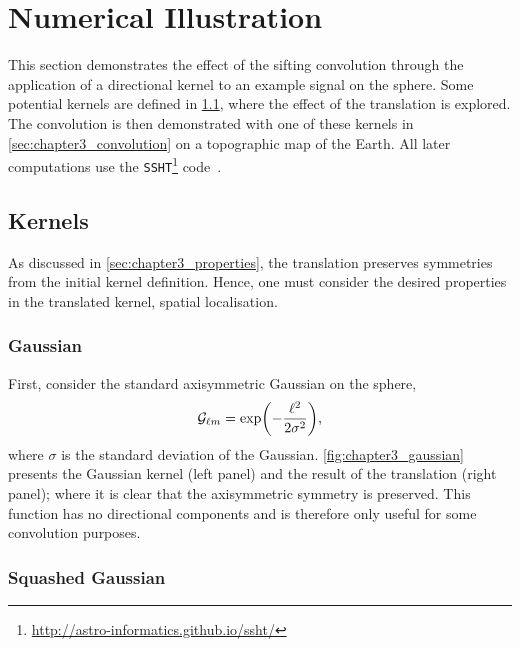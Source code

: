 \section{Numerical Illustration}\label{sec:chapter3_numerical_illustration}

This section demonstrates the effect of the sifting convolution through the application of a directional kernel to an example signal on the sphere.
Some potential kernels are defined in \cref{sec:chapter3_kernels}, where the effect of the translation is explored.
The convolution is then demonstrated with one of these kernels in \cref{sec:chapter3_convolution} on a topographic map of the Earth.
All later computations use the \texttt{SSHT}\footnote{\label{fn:ssht}\url{http://astro-informatics.github.io/ssht/}} code~\cite{McEwen2011}.

\subsection{Kernels}\label{sec:chapter3_kernels}

As discussed in \cref{sec:chapter3_properties}, the translation preserves symmetries from the initial kernel definition.
Hence, one must consider the desired properties in the translated kernel, \eg{} spatial localisation.

\subsubsection{Gaussian}

First, consider the standard axisymmetric Gaussian on the sphere, \ie{}
%
\begin{equation}
	{\mathcal{G}}_{\ell m}
	= \exp(-\frac{{\ell}^{2}}{2\sigma^{2}}),
\end{equation}
%
where \(\sigma{}\) is the standard deviation of the Gaussian.
\cref{fig:chapter3_gaussian} presents the Gaussian kernel (left panel) and the result of the translation (right panel); where it is clear that the axisymmetric symmetry is preserved.
This function has no directional components and is therefore only useful for some convolution purposes.



\subsubsection{Squashed Gaussian}

